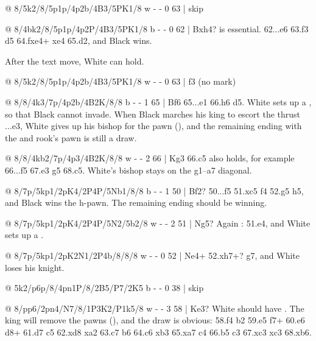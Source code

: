 @ 8/5k2/8/5p1p/4p2b/4B3/5PK1/8 w - - 0 63 | skip

@ 8/4bk2/8/5p1p/4p2P/4B3/5PK1/8 b - - 0 62 | Bxh4?
 is essential. 62...\K e6 63.f3 \K d5
64.fxe4+ \K xe4 65.\B d2, and Black wins.

After the text move, White can hold.

@ 8/5k2/8/5p1p/4p2b/4B3/5PK1/8 w - - 0 63 | f3 (no mark)

@ 8/8/4k3/7p/4p2b/4B2K/8/8 b - - 1 65 | Bf6
65...\B e1 66.\B h6 \K d5.
White sets up a , so that Black cannot invade. When Black marches
his king to escort the thrust ...e3, White gives up his bishop for the pawn
(), and the
remaining ending with the  and rook's pawn is still a
draw.

@ 8/8/4kb2/7p/4p3/4B2K/8/8 w - - 2 66 | Kg3
66.\B c5 also holds, for example 66...\K f5 67.\B e3 \B g5 68.\B c5. White's bishop stays on the
g1--a7 diagonal.

@ 8/7p/5kp1/2pK4/2P4P/5Nb1/8/8 b - - 1 50 | Bf2?
 50...\K f5
51.\K xc5 \K f4 52.\N g5 h5, and Black wins the h-pawn. The remaining ending should be winning.

@ 8/7p/5kp1/2pK4/2P4P/5N2/5b2/8 w - - 2 51 | Ng5?
Again : 51.\K e4, and White sets up a
.

@ 8/7p/5kp1/2pK2N1/2P4b/8/8/8 w - - 0 52 | Ne4+
52.\N xh7+? \K g7, and White loses his knight.

@ 5k2/p6p/8/4pn1P/8/2B5/P7/2K5 b - - 0 38 | skip

@ 8/pp6/2pn4/N7/8/1P3K2/P1k5/8 w - - 3 58 | Ke3?
White should have . The
king will remove the pawns
(),
and the draw is obvious: 58.\K f4 \K b2 59.\K e5 \N f7+ 60.\K e6 \N d8+ 61.\K d7 c5 62.\K xd8
\K xa2 63.\K c7 b6 64.\N c6 \K xb3 65.\N xa7 c4 66.\N b5 c3 67.\N xc3 \K xc3 68.\K xb6.


